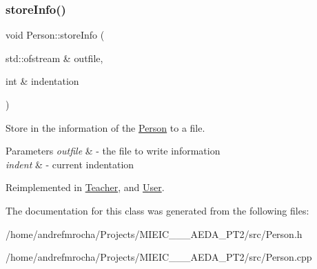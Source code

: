 \subsubsection{\texorpdfstring{store\+Info()}{storeInfo()}}
{\footnotesize\ttfamily void Person\+::store\+Info (\begin{DoxyParamCaption}\item[{std\+::ofstream \&}]{outfile,  }\item[{int \&}]{indentation }\end{DoxyParamCaption})\hspace{0.3cm}{\ttfamily [virtual]}}



Store in the information of the \mbox{\hyperlink{class_person}{Person}} to a file. 


\begin{DoxyParams}{Parameters}
{\em outfile} & -\/ the file to write information \\
\hline
{\em indent} & -\/ current indentation \\
\hline
\end{DoxyParams}


Reimplemented in \mbox{\hyperlink{class_teacher_a2ece0d60fa7ec4aaf93333aa0be0d25f}{Teacher}}, and \mbox{\hyperlink{class_user_aac5ff0f6899f3ce56d1b2d12ed557c79}{User}}.



The documentation for this class was generated from the following files\+:\begin{DoxyCompactItemize}
\item 
/home/andrefmrocha/\+Projects/\+M\+I\+E\+I\+C\+\_\+\_\+\_\+\+A\+E\+D\+A\+\_\+\+P\+T2/src/Person.\+h\item 
/home/andrefmrocha/\+Projects/\+M\+I\+E\+I\+C\+\_\+\_\+\_\+\+A\+E\+D\+A\+\_\+\+P\+T2/src/Person.\+cpp\end{DoxyCompactItemize}
